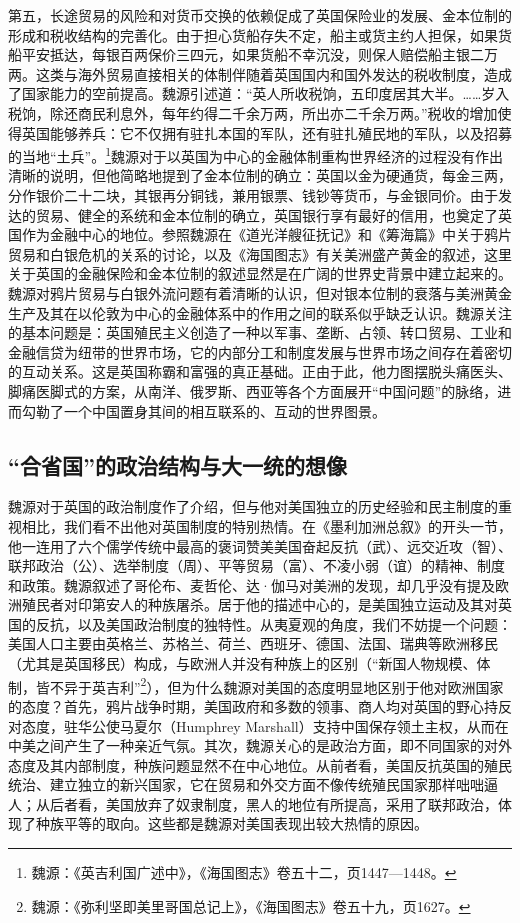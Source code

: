 \documentclass[a4paper, 12pt, openright]{ctexbook}
\begin{document}
第五，长途贸易的风险和对货币交换的依赖促成了英国保险业的发展、金本位制的形成和税收结构的完善化。由于担心货船存失不定，船主或货主约人担保，如果货船平安抵达，每银百两保价三四元，如果货船不幸沉没，则保人赔偿船主银二万两。这类与海外贸易直接相关的体制伴随着英国国内和国外发达的税收制度，造成了国家能力的空前提高。魏源引述道：“英人所收税饷，五印度居其大半。……岁入税饷，除还商民利息外，每年约得二千余万两，所出亦二千余万两。”税收的增加使得英国能够养兵：它不仅拥有驻扎本国的军队，还有驻扎殖民地的军队，以及招募的当地“土兵”。\footnote{魏源：《英吉利国广述中》，《海国图志》卷五十二，页1447—1448。}魏源对于以英国为中心的金融体制重构世界经济的过程没有作出清晰的说明，但他简略地提到了金本位制的确立：英国以金为硬通货，每金三两，分作银价二十二块，其银再分铜钱，兼用银票、钱钞等货币，与金银同价。由于发达的贸易、健全的系统和金本位制的确立，英国银行享有最好的信用，也奠定了英国作为金融中心的地位。参照魏源在《道光洋艘征抚记》和《筹海篇》中关于鸦片贸易和白银危机的关系的讨论，以及《海国图志》有关美洲盛产黄金的叙述，这里关于英国的金融保险和金本位制的叙述显然是在广阔的世界史背景中建立起来的。魏源对鸦片贸易与白银外流问题有着清晰的认识，但对银本位制的衰落与美洲黄金生产及其在以伦敦为中心的金融体系中的作用之间的联系似乎缺乏认识。魏源关注的基本问题是：英国殖民主义创造了一种以军事、垄断、占领、转口贸易、工业和金融信贷为纽带的世界市场，它的内部分工和制度发展与世界市场之间存在着密切的互动关系。这是英国称霸和富强的真正基础。正由于此，他力图摆脱头痛医头、脚痛医脚式的方案，从南洋、俄罗斯、西亚等各个方面展开“中国问题”的脉络，进而勾勒了一个中国置身其间的相互联系的、互动的世界图景。

\subsection{“合省国”的政治结构与大一统的想像}

魏源对于英国的政治制度作了介绍，但与他对美国独立的历史经验和民主制度的重视相比，我们看不出他对英国制度的特别热情。在《墨利加洲总叙》的开头一节，他一连用了六个儒学传统中最高的褒词赞美美国奋起反抗（武）、远交近攻（智）、联邦政治（公）、选举制度（周）、平等贸易（富）、不凌小弱（谊）的精神、制度和政策。魏源叙述了哥伦布、麦哲伦、达·伽马对美洲的发现，却几乎没有提及欧洲殖民者对印第安人的种族屠杀。居于他的描述中心的，是美国独立运动及其对英国的反抗，以及美国政治制度的独特性。从夷夏观的角度，我们不妨提一个问题：美国人口主要由英格兰、苏格兰、荷兰、西班牙、德国、法国、瑞典等欧洲移民（尤其是英国移民）构成，与欧洲人并没有种族上的区别（“新国人物规模、体制，皆不异于英吉利”\footnote{魏源：《弥利坚即美里哥国总记上》，《海国图志》卷五十九，页1627。}），但为什么魏源对美国的态度明显地区别于他对欧洲国家的态度？首先，鸦片战争时期，美国政府和多数的领事、商人均对英国的野心持反对态度，驻华公使马夏尔（Humphrey Marshall）支持中国保存领土主权，从而在中美之间产生了一种亲近气氛。其次，魏源关心的是政治方面，即不同国家的对外态度及其内部制度，种族问题显然不在中心地位。从前者看，美国反抗英国的殖民统治、建立独立的新兴国家，它在贸易和外交方面不像传统殖民国家那样咄咄逼人；从后者看，美国放弃了奴隶制度，黑人的地位有所提高，采用了联邦政治，体现了种族平等的取向。这些都是魏源对美国表现出较大热情的原因。
\end{document}
